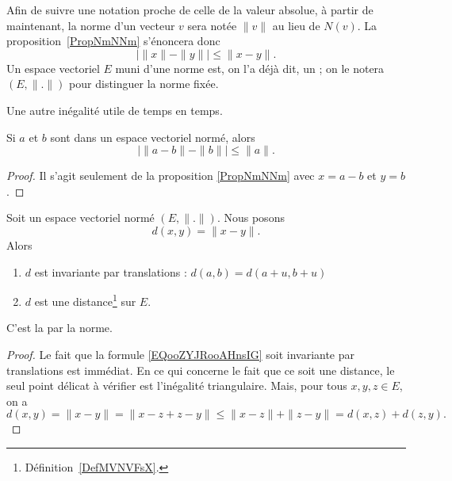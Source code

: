 \begin{normaltext}
	Afin de suivre une notation proche de celle de la valeur absolue, à partir de maintenant, la norme d'un vecteur $v$ sera notée $\| v\|$ au lieu de $N(v)$. La proposition~\ref{PropNmNNm} s'énoncera donc
	\begin{equation}
		\big| \| x \|-\| y \| \big|\leq \| x-y \|.
	\end{equation}
	Un espace vectoriel $E$ muni d'une norme est, on l'a déjà dit, un ; on le notera $(E,\| . \|)$ pour distinguer la norme fixée.
\end{normaltext}

Une autre inégalité utile de temps en temps.
\begin{corollary}       \label{CORooDFBGooAqVRfS}
	Si \( a\) et \( b\) sont dans un espace vectoriel normé, alors
	\begin{equation}
		\big| \| a-b \|-\| b \| \big|\leq \| a \|.
	\end{equation}
\end{corollary}

\begin{proof}
	Il s'agit seulement de la proposition \ref{PropNmNNm} avec \( x=a-b\) et \( y=b\).
\end{proof}

\begin{lemmaDef}        \label{LEMooWGBJooYTDYIK}
	Soit un espace vectoriel normé \( (E,\| . \|)\). Nous posons
	\begin{equation}        \label{EQooZYJRooAHnsIG}
		d(x,y)=\| x-y \| .
	\end{equation}
	Alors
	\begin{enumerate}
		\item       \label{ITEMooLITDooPeReOk}
		      \( d\) est invariante par translations : $d(a,b)=d(a+u,b+u)$
		\item
		      \( d\) est une distance\footnote{Définition~\ref{DefMVNVFsX}.} sur \( E\).
	\end{enumerate}
	C'est la  par la norme.
\end{lemmaDef}

\begin{proof}
	Le fait que la formule \eqref{EQooZYJRooAHnsIG} soit invariante par translations est immédiat. En ce qui concerne le fait que ce soit une distance, le seul point délicat à vérifier est l'inégalité triangulaire. Mais, pour tous \( x, y, z \in E\), on a
	\begin{equation}
		d(x,y)=\| x-y \| = \| x-z+z-y \|  \leq\| x - z \|+\| z - y\| =d(x,z)+d(z,y).
	\end{equation}
\end{proof}


